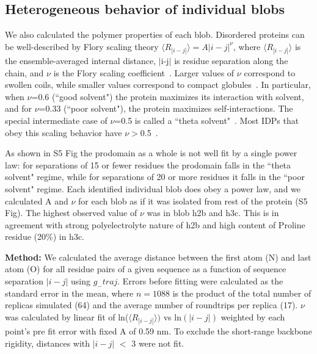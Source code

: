 \documentclass{article}
\begin{document}
\subsection*{Heterogeneous behavior of individual blobs}

We also calculated the polymer properties of each blob. Disordered proteins can be well-described by Flory scaling theory $\langle R_{|i-j|}\rangle = A|i-j|^{\nu}$, where $\langle R_{|i-j|}\rangle$ is the ensemble-averaged internal distance, $|$i-j$|$ is residue separation along the chain, and $\nu$ is the Flory scaling coefficient~\cite{Flory1949}. Larger values of $\nu$ correspond to swollen coils, while smaller values correspond to compact globules~\cite{Das2013}. In particular, when $\nu$=0.6 (``good solvent") the protein maximizes its interaction with solvent, and for $\nu$=0.33 (``poor solvent"), the protein maximizes self-interactions. The special intermediate case of $\nu$=0.5 is called a ``theta solvent"~\cite{Flory1949}. Most IDPs that obey this scaling behavior have $\nu$$>$0.5~\cite{Hofmann2012,Das2013,Zerze2015,Meng2018}. 

As shown in S5 Fig the prodomain as a whole is not well fit by a single power law: for separations of 15 or fewer residues the prodomain falls in the ``theta solvent" regime, while for separations of 20 or more residues it falls in the ``poor solvent" regime. Each identified individual blob does obey a power law, and we calculated A and $\nu$ for each blob as if it was isolated from rest of the protein (S5 Fig). The highest observed value of $\nu$ was in blob h2b and h3c. This is in agreement with strong polyelectrolyte nature of h2b and high content of Proline residue (20\%) in h3c.

\textbf{Method:} We calculated the average distance between the first atom (N) and last atom (O) for all residue pairs of a given sequence as a function of sequence separation $|i-j|$ using $g_{-}traj$. Errors before fitting were calculated as the standard error in the mean, where $n = 1088$ is the product of the total number of replicas simulated (64) and the average number of roundtrips per replica (17). $\nu$ was calculated by linear fit of ln($\langle R_{|i-j|}\rangle)$ vs ln$(|i-j|)$ weighted by each point's pre fit error with fixed A of 0.59 nm. To exclude the short-range backbone rigidity, distances with $|i-j|$ $<$ 3 were not fit.


\end{document}
